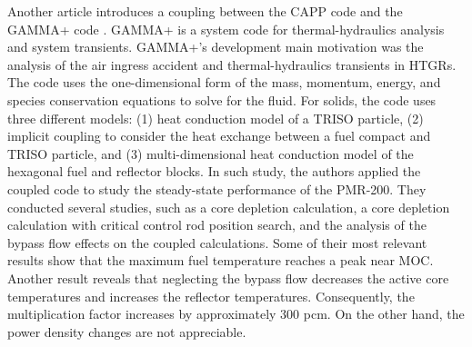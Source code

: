 \documentclass[11pt,letterpaper]{article}
\begin{document}
Another article \cite{tak_cappgamma_2016} introduces a coupling between the CAPP code and the GAMMA+ code \cite{lim_gamma_2006}.
GAMMA+ is a system code for thermal-hydraulics analysis and system transients.
GAMMA+'s development main motivation was the analysis of the air ingress accident and thermal-hydraulics transients in \glspl{HTGR}.
The code uses the one-dimensional form of the mass, momentum, energy, and species conservation equations to solve for the fluid.
For solids, the code uses three different models: (1) heat conduction model of a TRISO particle, (2) implicit coupling to consider the heat exchange between a fuel compact and TRISO particle, and (3) multi-dimensional heat conduction model of the hexagonal fuel and reflector blocks.
In such study, the authors applied the coupled code to study the steady-state performance of the PMR-200.
They conducted several studies, such as a core depletion calculation, a core depletion calculation with critical control rod position search, and the analysis of the bypass flow effects on the coupled calculations.
Some of their most relevant results show that the maximum fuel temperature reaches a peak near MOC.
Another result reveals that neglecting the bypass flow decreases the active core temperatures and increases the reflector temperatures.
Consequently, the multiplication factor increases by approximately 300 pcm.
On the other hand, the power density changes are not appreciable.
\end{document}
